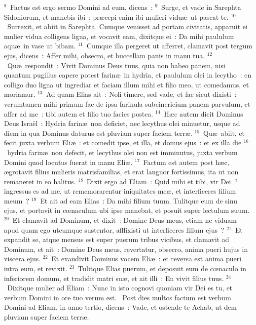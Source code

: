 ${}^{8}$~Factus est ergo sermo Domini ad eum, dicens~:
${}^{9}$~Surge, et vade in Sarephta Sidoniorum, et manebis ibi~: pr\ae cepi enim ibi mulieri vidu\ae\ ut pascat te.
${}^{10}$~Surrexit, et abiit in Sarephta. Cumque venisset ad portam civitatis, apparuit ei mulier vidua colligens ligna, et vocavit eam, dixitque ei~: Da mihi paululum aqu\ae\ in vase ut bibam.
${}^{11}$~Cumque illa pergeret ut afferret, clamavit post tergum ejus, dicens~: Affer mihi, obsecro, et buccellam panis in manu tua.
${}^{12}$~Qu\ae\ respondit~: Vivit Dominus Deus tuus, quia non habeo panem, nisi quantum pugillus capere potest farin\ae\ in hydria, et paululum olei in lecytho~: en colligo duo ligna ut ingrediar et faciam illum mihi et filio meo, ut comedamus, et moriamur.
${}^{13}$~Ad quam Elias ait~: Noli timere, sed vade, et fac sicut dixisti~: verumtamen mihi primum fac de ipsa farinula subcinericium panem parvulum, et affer ad me~: tibi autem et filio tuo facies postea.
${}^{14}$~H\ae c autem dicit Dominus Deus Isra\"el~: Hydria farin\ae\ non deficiet, nec lecythus olei minuetur, usque ad diem in qua Dominus daturus est pluviam super faciem terr\ae .
${}^{15}$~Qu\ae\ abiit, et fecit juxta verbum Eli\ae~: et comedit ipse, et illa, et domus ejus~: et ex illa die
${}^{16}$~hydria farin\ae\ non defecit, et lecythus olei non est imminutus, juxta verbum Domini quod locutus fuerat in manu Eli\ae .
${}^{17}$~Factum est autem post h\ae c, \ae grotavit filius mulieris matrisfamilias, et erat languor fortissimus, ita ut non remaneret in eo halitus.
${}^{18}$~Dixit ergo ad Eliam~: Quid mihi et tibi, vir Dei~? ingressus es ad me, ut rememorarentur iniquitates me\ae , et interficeres filium meum~?
${}^{19}$~Et ait ad eam Elias~: Da mihi filium tuum. Tulitque eum de sinu ejus, et portavit in cœnaculum ubi ipse manebat, et posuit super lectulum suum.
${}^{20}$~Et clamavit ad Dominum, et dixit~: Domine Deus meus, etiam ne viduam apud quam ego utcumque sustentor, afflixisti ut interficeres filium ejus~?
${}^{21}$~Et expandit se, atque mensus est super puerum tribus vicibus, et clamavit ad Dominum, et ait~: Domine Deus meus, revertatur, obsecro, anima pueri hujus in viscera ejus.
${}^{22}$~Et exaudivit Dominus vocem Eli\ae~: et reversa est anima pueri intra eum, et revixit.
${}^{23}$~Tulitque Elias puerum, et deposuit eum de cœnaculo in inferiorem domum, et tradidit matri su\ae , et ait illi~: En vivit filius tuus.
${}^{24}$~Dixitque mulier ad Eliam~: Nunc in isto cognovi quoniam vir Dei es tu, et verbum Domini in ore tuo verum est.
~Post dies multos factum est verbum Domini ad Eliam, in anno tertio, dicens~: Vade, et ostende te Achab, ut dem pluviam super faciem terr\ae .
